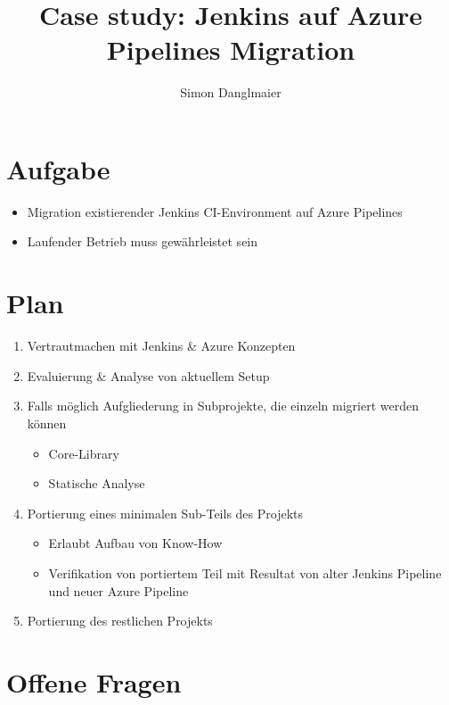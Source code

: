 \documentclass{article}
\begin{document}
\title{Case study: Jenkins auf Azure Pipelines Migration}
\author{Simon Danglmaier}

\maketitle

\section*{Aufgabe}

\begin{itemize}
    \item Migration existierender Jenkins CI-Environment auf Azure Pipelines
    \item Laufender Betrieb muss gewährleistet sein
\end{itemize}

\section*{Plan}
\begin{enumerate}
    \item Vertrautmachen mit Jenkins \& Azure Konzepten
    \item Evaluierung \& Analyse von aktuellem Setup
    \item Falls möglich Aufgliederung in Subprojekte, die einzeln migriert werden können
          \begin{itemize}
              \item Core-Library
              \item Statische Analyse
          \end{itemize}
    \item Portierung eines minimalen Sub-Teils des Projekts
          \begin{itemize}
              \item Erlaubt Aufbau von Know-How
              \item Verifikation von portiertem Teil mit Resultat von alter Jenkins Pipeline und neuer Azure Pipeline
          \end{itemize}
    \item Portierung des restlichen Projekts
\end{enumerate}

\section*{Offene Fragen}
\end{document}
